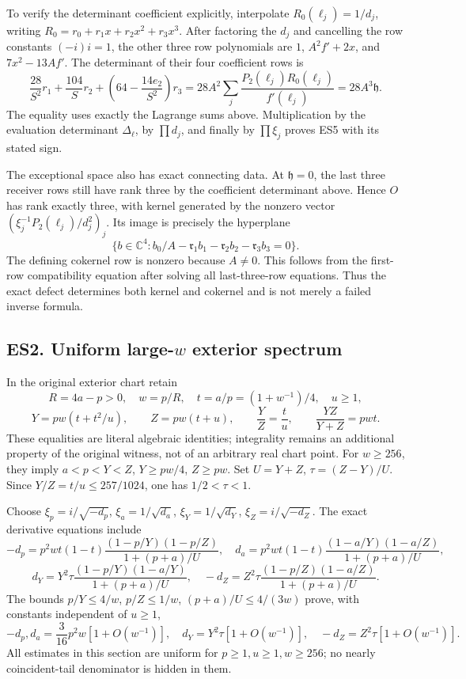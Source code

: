 \documentclass[11pt]{article}
\begin{document}
To verify the determinant coefficient explicitly, interpolate \(R_0(\ell_j)=1/d_j\), writing \(R_0=r_0+r_1x+r_2x^2+r_3x^3\). After factoring the \(d_j\) and cancelling the row constants \((-i)i=1\), the other three row polynomials are \(1\), \(A^2f'+2x\), and \(7x^2-13Af'\). The determinant of their four coefficient rows is \[
\frac{28}{S^2}r_1+\frac{104}{S}r_2+
\left(64-\frac{14e_2}{S^2}\right)r_3
=28A^2\sum_j\frac{P_2(\ell_j)R_0(\ell_j)}{f'(\ell_j)}
=28A^3\mathfrak h.
\] The equality uses exactly the Lagrange sums above. Multiplication by the evaluation determinant \(\Delta_\ell\), by \(\prod d_j\), and finally by \(\prod\xi_j\) proves ES5 with its stated sign.

The exceptional space also has exact connecting data. At \(\mathfrak h=0\), the last three receiver rows still have rank three by the coefficient determinant above. Hence \(O\) has rank exactly three, with kernel generated by the nonzero vector \((\xi_j^{-1}P_2(\ell_j)/d_j^2)_j\). Its image is precisely the hyperplane \[
\{b\in\mathbb C^4:b_0/A-\mathfrak r_1b_1-\mathfrak r_2b_2-\mathfrak r_3b_3=0\}.
\] The defining cokernel row is nonzero because \(A\ne0\). This follows from the first-row compatibility equation after solving all last-three-row equations. Thus the exact defect determines both kernel and cokernel and is not merely a failed inverse formula.

\subsection{\texorpdfstring{ES2. Uniform large-\(w\) exterior spectrum}{ES2. Uniform large-w exterior spectrum}}\label{es2.-uniform-large-w-exterior-spectrum}

In the original exterior chart retain \[
R=4a-p>0,\quad w=p/R,\quad t=a/p=(1+w^{-1})/4,\quad u\ge1,
\] \[
Y=pw(t+t^2/u),\qquad Z=pw(t+u),\qquad
\frac YZ=\frac tu,\qquad\frac{YZ}{Y+Z}=pwt.
\tag{ES6}
\] These equalities are literal algebraic identities; integrality remains an additional property of the original witness, not of an arbitrary real chart point. For \(w\ge256\), they imply \(a<p<Y<Z\), \(Y\ge pw/4\), \(Z\ge pw\). Set \(U=Y+Z\), \(\tau=(Z-Y)/U\). Since \(Y/Z=t/u\le257/1024\), one has \(1/2<\tau<1\).

Choose \(\xi_p=i/\sqrt{-d_p}\), \(\xi_a=1/\sqrt{d_a}\), \(\xi_Y=1/\sqrt{d_Y}\), \(\xi_Z=i/\sqrt{-d_Z}\). The exact derivative equations include \[
-d_p=p^2wt(1-t)\frac{(1-p/Y)(1-p/Z)}{1+(p+a)/U},\quad
d_a=p^2wt(1-t)\frac{(1-a/Y)(1-a/Z)}{1+(p+a)/U},
\] \[
d_Y=Y^2\tau\frac{(1-p/Y)(1-a/Y)}{1+(p+a)/U},\quad
-d_Z=Z^2\tau\frac{(1-p/Z)(1-a/Z)}{1+(p+a)/U}.
\tag{ES7}
\] The bounds \(p/Y\le4/w\), \(p/Z\le1/w\), \((p+a)/U\le4/(3w)\) prove, with constants independent of \(u\ge1\), \[
-d_p,d_a=\frac3{16}p^2w[1+O(w^{-1})],\quad
d_Y=Y^2\tau[1+O(w^{-1})],\quad-d_Z=Z^2\tau[1+O(w^{-1})].
\tag{ES8}
\] All estimates in this section are uniform for \(p\ge1,u\ge1,w\ge256\); no nearly coincident-tail denominator is hidden in them.
\end{document}

